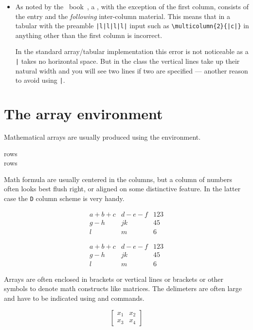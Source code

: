 \begin{itemize}
 \item As noted by the \ltx\ book~\cite{LAMPORT94}, a 
   \cmd{\multicolumn}, with the exception of the first column,
   consists of the entry and the \emph{following} inter-column
   material. This means that in a tabular with the preamble
   \verb?|l|l|l|l|? input such as \verb?\multicolumn{2}{|c|}? in
   anything other than the first column is incorrect.

   In the standard array/tabular implementation this error is not 
   noticeable as a \verb?|? takes no horizontal space. But in the class the
   vertical lines take up their natural width and you will see two lines if
   two are specified --- another reason to avoid using \verb?|?.

 \end{itemize}

\section{The array environment}

    Mathematical arrays are usually produced using the  environment.

\begin{syntax}
\cmd{\[}  rows  \cmd{\]} \\
\cmd{\[}  rows  \cmd{\]} \\
\end{syntax}
    Math formula are usually centered in the columns, but a column of 
numbers often looks best flush right, or aligned on some distinctive
feature. In the latter case the \texttt{D} column scheme is very handy.
\begin{lcode}
\[ \begin{array}{lcr}
   a +b +c & d - e - f & 123 \\
   g-h     &  j k      & 45 \\
    l      &   m       & 6
  \end{array} \]
\end{lcode}

\[ \begin{array}{lcr}
   a +b +c & d - e - f & 123 \\
   g-h     &  j k      & 45 \\
    l      &   m       & 6
  \end{array} \]

    Arrays are often enclosed in brackets or vertical lines or brackets 
or other symbols to
denote math constructs like matrices. The delimeters are often large and have
to be indicated using \cmd{\left} and \cmd{\right} commands.
\begin{lcode}
\[ \left[ \begin{array}{cc}
          x_{1} & x_{2} \\
          x_{3} & x_{4}
          \end{array} \right] \]
\end{lcode}

